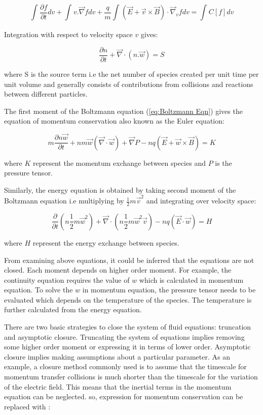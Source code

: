\documentclass[paper=a4, fontsize=13pt]{scrartcl}
\begin{document}
\begin{equation}
\int_{}^{} \frac{\partial f}{\partial t} dv + \int_{}^{} v.\vec{\nabla} f dv + \frac{q}{m} \int_{}^{}(\vec{E} + \vec{v} \times \vec{B}) \cdot \vec{\nabla}_v f dv = \int_{}^{} C[f] dv 
\end{equation}

Integration with respect to velocity space $v$ gives:

\begin{equation}
\frac{\partial n}{\partial t} + \vec{\nabla} \cdot (n.\vec{w}) = S
\end{equation}

where S is the source term i.e the net number of species created per unit time per unit volume and generally consists of contributions from collisions and reactions between different particles.

The first moment of the Boltzmann equation (\ref{eq:Boltzmann Eqn}) gives the equation of momentum conservation also known as the Euler equation:

\begin{equation}
m\frac{\partial n\vec{w}}{\partial t} + nm\vec{w} (\vec{\nabla} \cdot \vec{w}) + \vec{\nabla} P - nq (\vec{E} + \vec{w} \times \vec{B}) = K
\end{equation}

where $K$ represent the momentum exchange between species and $P$ is the pressure tensor.

Similarly, the energy equation is obtained by taking second moment of the Boltzmann equation i.e multiplying by $\frac{1}{2} m \vec{v}^2$ and integrating over velocity space:

\begin{equation}
\frac{\partial }{\partial t}(n \frac{1}{2} m \vec{w}^2) + \vec{\nabla} \cdot (n \frac{1}{2} m \vec{w}^2 \vec{v}) - nq (\vec{E} \cdot \vec{w}) = H
\end{equation}

where $H$ represent the energy exchange between species.

From examining above equations, it could be inferred that the equations are not closed. Each moment depends on higher order moment. For example, the continuity equation requires the value of $w$ which is calculated in momentum equation. To solve the $w$ in momentum equation, the pressure tensor needs to be evaluated which depends on the temperature of the species. The temperature is further calculated from the energy equation.

There are two basic strategies to close the system of fluid equations: truncation and asymptotic closure. Truncating the system of equations implies removing some higher order moment or expressing it in terms of lower order. Asymptotic closure implies making assumptions about a particular parameter. As an example, a closure method commonly used is to assume that the timescale for momentum transfer collisions is much shorter than the timescale for the variation of the electric field. This means that the inertial terms in the momentum equation can be neglected. so, expression for momentum conservation can be replaced with :
\end{document}
